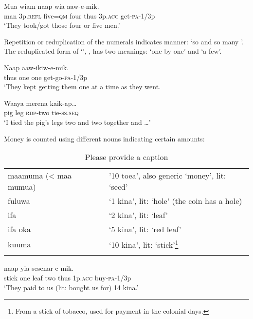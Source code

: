 \ea%
\label{ex:3:x92}
\gll Mua wiam   naap wia aaw-e-mik. \\
man 3p.\textsc{refl} five=\textsc{qm} four thus 3p.\textsc{acc} get-\textsc{pa}-1/3p\\
\glt`They took/got those four or five men.'
\z

Repetition  or reduplication  of the numerals indicates manner: `so and so many '. The reduplicated form of  `', , has two meanings: `one by one' and `a few'. 

\ea%
\label{ex:3:x93}
\gll Naap   aaw-ikiw-e-mik. \\
thus one one get-go-\textsc{pa}-1/3p\\
\glt`They kept getting them one at a time as they went.
\z

\ea%
\label{ex:3:x94}
\gll Waaya merena  kaik-ap{\dots} \\
pig leg \textsc{rdp}-two tie-\textsc{ss}.\textsc{seq}\\
\glt`I tied the pig's legs two and two together and {\dots}'
\z

Money is counted using different nouns indicating certain amounts:

\begin{table}
\caption{Please provide a caption}
\label{} 
\begin{tabular}{ll}
\mytoprule
maamuma ({\textless} maa mumua) &'10 toea', also generic `money', lit: `seed'\\
fuluwa &`1 kina', lit: `hole' (the coin has a hole)\\
ifa &`2 kina', lit: `leaf'\\
ifa oka &`5 kina', lit: `red leaf'\\
kuuma &`10 kina', lit: `stick'\footnote{From a stick of tobacco, used for payment in the colonial days.} \\
\mybottomrule
\end{tabular}
\end{table}


\ea%
\label{ex:3:x97}
\gll {}    naap yia sesenar-e-mik. \\
stick one leaf two thus 1p.\textsc{acc} buy-\textsc{pa}-1/3p\\
\glt`They paid to us (lit: bought us for) 14 kina.' 
\z

